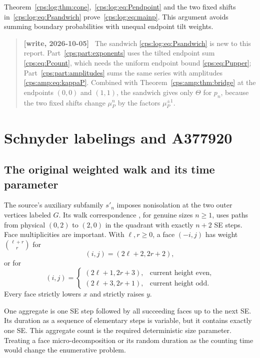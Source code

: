 \documentclass[11pt,letterpaper]{article}
\numberwithin{equation}{section}
\theoremstyle{remark}\newtheorem{remark}[theorem]{Remark}
\newenvironment{writenotelog}{\begin{quote}\small\sloppy\textbf{[write, 2026-10-05]}\ }{\end{quote}}
\begin{document}
Theorem~\ref{cps:log:thm:cone},~\eqref{cps:log:eq:Pendpoint} and the two fixed shifts
in~\eqref{cps:log:eq:Psandwich} prove~\eqref{cps:log:eq:mainp}. This argument avoids
summing boundary probabilities with unequal endpoint tilt weights.

\begin{writenotelog}
The sandwich \eqref{cps:log:eq:Psandwich} is new to this report.
Part~\ref{cps:part:exponents} uses the tilted endpoint sum \eqref{cps:eq:Pcount}, which needs the
uniform endpoint bound \eqref{cps:eq:Pupper}; Part~\ref{cps:part:amplitudes} sums the same series
with amplitudes \eqref{cps:amp:eq:kappaP}. Combined with Theorem~\ref{cps:amp:thm:bridge} at the
endpoints $(0,0)$ and $(1,1)$, the sandwich gives only $\Theta$ for $p_n$, because the two fixed
shifts change $\mu_P^n$ by the factors $\mu_P^{\pm1}$.
\end{writenotelog}

\section{Schnyder labelings and A377920}\label{cps:log:sec:schnyder}
\subsection{The original weighted walk and its time parameter}
The source's auxiliary subfamily $s'_n$ imposes nonisolation at the
two outer vertices labeled $G$. Its walk correspondence
\cite[Proposition 14]{FNS}, for genuine sizes $n\ge1$, uses paths
from physical $(0,2)$ to $(2,0)$ in the quadrant with exactly $n+2$
SE steps. Face multiplicities are important. With $\ell,r\ge0$,
a face $(-i,j)$ has weight $\binom{\ell+r}{r}$ for
\[
 (i,j)=(2\ell+2,2r+2),
\]
or for
\[
 (i,j)=
 \begin{cases}
 (2\ell+1,2r+3),&\text{current height even},\\
 (2\ell+3,2r+1),&\text{current height odd}.
 \end{cases}
\]
Every face strictly lowers $x$ and strictly raises $y$.

One aggregate is one SE step followed by all succeeding faces up to
the next SE. Its duration as a sequence of elementary steps is
variable, but it contains exactly one SE. This aggregate count is
the required deterministic size parameter. Treating a face
micro-decomposition or its random duration as the counting time would
change the enumerative problem.
\end{document}
